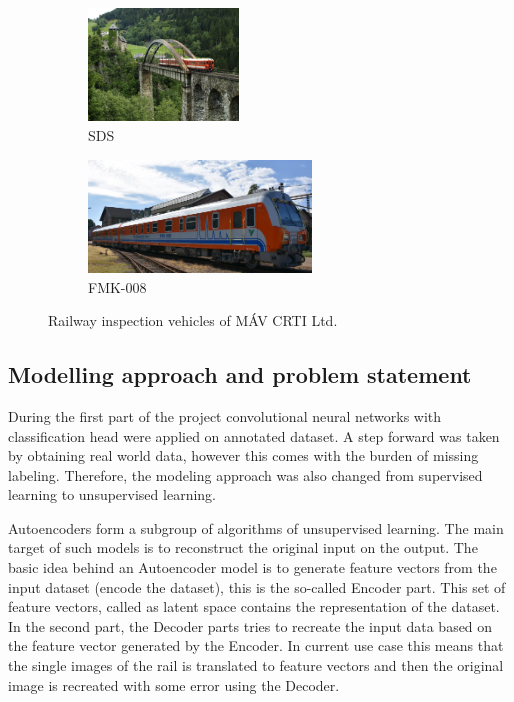 \begin{figure}[!ht]
    \centering
    \begin{subfigure}{0.45\textwidth}
        \centering
        \includegraphics[height=3cm]{./tex_images/sds.jpg}
        \caption*{SDS}
    \end{subfigure}
    \begin{subfigure}{0.45\textwidth}
        \centering
        \includegraphics[height=3cm]{./tex_images/FMK008.jpg}
        \caption*{FMK-008}
    \end{subfigure}
    \caption{Railway inspection vehicles of MÁV CRTI Ltd.}
    \label{fig:vehicles}
\end{figure}

\subsection{Modelling approach and problem statement}
During the first part of the project convolutional neural networks with classification head were applied
on annotated dataset.
A step forward was taken by obtaining real world data, however this comes with the burden of
missing labeling.
Therefore, the modeling approach was also changed from supervised learning to unsupervised learning.

Autoencoders form a subgroup of algorithms of unsupervised learning.
The main target of such models is to reconstruct the original input on the output.
The basic idea behind an Autoencoder model is to generate feature vectors from the input
dataset (encode the dataset), this is the so-called Encoder part.
This set of feature vectors, called as latent space contains the representation of the dataset.
In the second part, the Decoder parts tries to recreate the input data based on the feature vector
generated by the Encoder.
In current use case this means that the single images of the rail is translated to feature vectors
and then the original image is recreated with some error using the Decoder.

